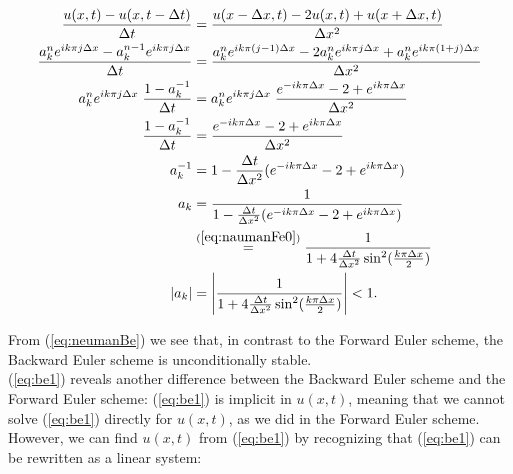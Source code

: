 \documentclass{article}
\begin{document}
\begin{subequations}
	\begin{align}
		\frac{u(x, t) - u(x,t - \Delta t)}{\Delta t}  &= \frac{u(x - \Delta x, t) - 2u(x,t) + u(x+ \Delta x, t)}{\Delta x^2} \\
		\frac{a_k^n e^{i k \pi j \Delta x} - a_k^{n-1} e^{i k \pi j \Delta x}}{\Delta t}  &= \frac{a_k^n e^{i k \pi (j -1)\Delta x} - 2a_k^n e^{i k \pi j \Delta x} + a_k^n e^{i k \pi (1 + j)\Delta x}}{\Delta x^2} \\
		a_k^n e^{i k \pi j \Delta x}\; \frac{1 - a_k^{-1}}{\Delta t}&=
		a_k^n e^{i k \pi j \Delta x}\; \frac{e^{-i k \pi \Delta x} - 2 + e^{i k \pi \Delta x}}{\Delta x^2}\\
		\frac{1 - a_k^{-1}}{\Delta t}&= \frac{e^{-i k \pi \Delta x} - 2 + e^{i k \pi \Delta x}}{\Delta x^2}\\
		a_k^{-1} &= 1 - \frac{\Delta t}{\Delta x^2} (e^{-i k \pi \Delta x} - 2 + e^{i k \pi \Delta x})\\
		a_k &= \frac{1}{1 - \frac{\Delta t}{\Delta x^2} (e^{-i k \pi \Delta x} - 2 + e^{i k \pi \Delta x})}\\
		&\stackrel{(\ref{eq:naumanFe0})}{=}  \frac{1}{1 + 4 \frac{\Delta t}{\Delta x^2} \sin^2(\frac{k\pi\Delta x}{2})}\\
		|a_k| &=  \left|\frac{1}{1 + 4 \frac{\Delta t}{\Delta x^2} \sin^2(\frac{k\pi\Delta x}{2})}\right| < 1.\label{eq:neumanBe}\\
	\end{align}
\end{subequations}

From (\ref{eq:neumanBe}) we see that, in contrast to the Forward Euler scheme, the Backward Euler scheme is unconditionally stable.\\

(\ref{eq:be1}) reveals another difference between the Backward Euler scheme and the Forward Euler scheme: (\ref{eq:be1}) is implicit in $u(x,t)$, meaning that we cannot solve (\ref{eq:be1}) directly for $u(x,t)$, as we did in the Forward Euler scheme. However, we can find $u(x,t)$ from (\ref{eq:be1}) by recognizing that (\ref{eq:be1}) can be rewritten as a linear system:
\end{document}
